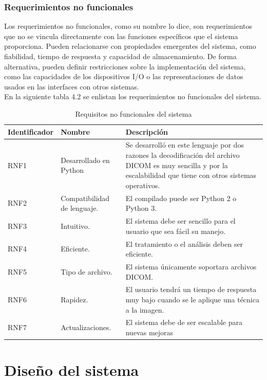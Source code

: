 \documentclass[12pt]{report}
\begin{document}
\subsection{Requerimientos no funcionales}
Los requerimientos no funcionales, como su nombre lo dice, son requerimientos que no se vincula directamente con las funciones específicos que el sistema proporciona. Pueden relacionarse con propiedades emergentes del sistema, como fiabilidad, tiempo de respuesta y capacidad de almacenamiento. De forma alternativa, pueden definir restricciones sobre la implementación del sistema, como las capacidades de los dispositivos I/O o las representaciones de datos
usados en las interfaces con otros sistemas. \cite{isRF} \\

En la siguiente tabla 4.2 se enlistan los requerimientos no funcionales del sistema.

\begin{table}[H]
\begin{center}
\begin{tabular}{|p{23mm}|p{35mm}|p{75mm}|}
\hline
 Identificador & Nombre & Descripción \\
\hline \hline 
RNF1 & Desarrollado en Python & Se desarrolló en este lenguaje por dos razones la decodificación del archivo DICOM es muy sencilla y por la escalabilidad que tiene con otros sistemas operativos.\\
\hline
RNF2 & Compatibilidad de lenguaje. & El compilado puede ser Python 2 o Python 3.\\
\hline
RNF3 & Intuitivo. & El sistema debe ser sencillo para el usuario que sea fácil su manejo.\\
\hline
RNF4 & Eficiente. & El tratamiento o el análisis deben ser eficiente.\\
\hline
RNF5 & Tipo de archivo. & El sistema únicamente soportara archivos DICOM.\\
\hline
RNF6 & Rapidez. & El usuario tendrá un tiempo de respuesta muy bajo cuando se le aplique una técnica a la imagen.\\
\hline
RNF7 & Actualizaciones. & El sistema debe de ser escalable para nuevas mejoras\\
\hline
\end{tabular}
\caption{Requisitos no funcionales del sistema}
\end{center}
\end{table}

\chapter{Diseño del sistema}
\end{document}

